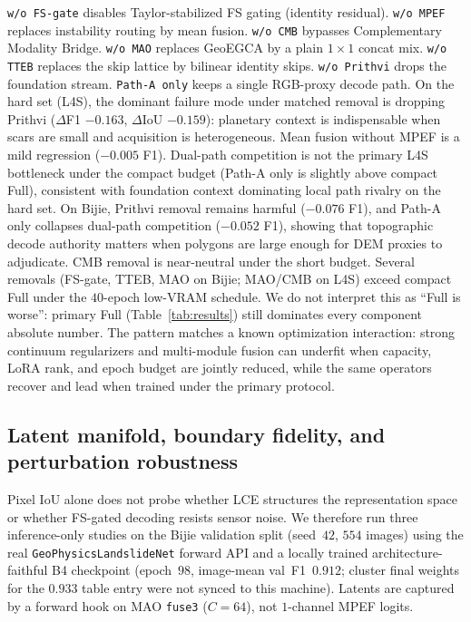 \documentclass[10pt,twocolumn,letterpaper]{article}
\begin{document}
\texttt{w/o FS-gate} disables Taylor-stabilized FS gating (identity residual). \texttt{w/o MPEF} replaces instability routing by mean fusion. \texttt{w/o CMB} bypasses Complementary Modality Bridge. \texttt{w/o MAO} replaces GeoEGCA by a plain $1{\times}1$ concat mix. \texttt{w/o TTEB} replaces the skip lattice by bilinear identity skips. \texttt{w/o Prithvi} drops the foundation stream. \texttt{Path-A only} keeps a single RGB-proxy decode path. On the hard set (L4S), the dominant failure mode under matched removal is dropping Prithvi (\(\Delta\)F1 $-0.163$, \(\Delta\)IoU $-0.159$): planetary context is indispensable when scars are small and acquisition is heterogeneous. Mean fusion without MPEF is a mild regression ($-0.005$ F1). Dual-path competition is not the primary L4S bottleneck under the compact budget (Path-A only is slightly above compact Full), consistent with foundation context dominating local path rivalry on the hard set. On Bijie, Prithvi removal remains harmful (\(-0.076\) F1), and Path-A only collapses dual-path competition (\(-0.052\) F1), showing that topographic decode authority matters when polygons are large enough for DEM proxies to adjudicate. CMB removal is near-neutral under the short budget. Several removals (FS-gate, TTEB, MAO on Bijie; MAO/CMB on L4S) exceed compact Full under the $40$-epoch low-VRAM schedule. We do not interpret this as ``Full is worse'': primary Full (Table~\ref{tab:results}) still dominates every component absolute number. The pattern matches a known optimization interaction: strong continuum regularizers and multi-module fusion can underfit when capacity, LoRA rank, and epoch budget are jointly reduced, while the same operators recover and lead when trained under the primary protocol.

\subsection{Latent manifold, boundary fidelity, and perturbation robustness}
Pixel IoU alone does not probe whether LCE structures the representation space or whether FS-gated decoding resists sensor noise. We therefore run three inference-only studies on the Bijie validation split (seed~$42$, $554$ images) using the real \texttt{GeoPhysicsLandslideNet} forward API and a locally trained architecture-faithful B4 checkpoint (epoch~$98$, image-mean val~F1~$0.912$; cluster final weights for the $0.933$ table entry were not synced to this machine). Latents are captured by a forward hook on MAO \texttt{fuse3} ($C{=}64$), not $1$-channel MPEF logits.
\end{document}
